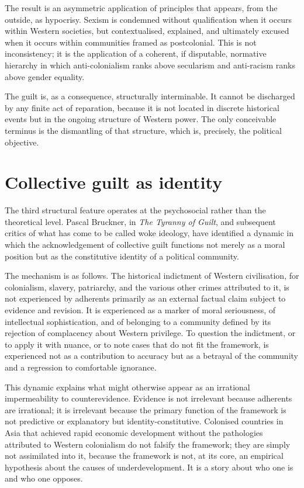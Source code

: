 	The result is an asymmetric application of principles that appears, from the outside,
	as hypocrisy. Sexism is condemned without qualification when it occurs within Western
	societies, but contextualised, explained, and ultimately excused when it occurs
	within communities framed as postcolonial. This is not inconsistency; it is the
	application of a coherent, if disputable, normative hierarchy in which
	anti-colonialism ranks above secularism and anti-racism ranks above gender equality.
	
	The guilt is, as a consequence, structurally interminable. It cannot be discharged
	by any finite act of reparation, because it is not located in discrete historical
	events but in the ongoing structure of Western power. The only conceivable terminus
	is the dismantling of that structure, which is, precisely, the political objective.
	
	\section{Collective guilt as identity}
	
	The third structural feature operates at the psychosocial rather than the
	theoretical level. Pascal Bruckner, in \emph{The Tyranny of Guilt}, and subsequent
	critics of what has come to be called woke ideology, have identified a dynamic in
	which the acknowledgement of collective guilt functions not merely as a moral
	position but as the constitutive identity of a political community.
	
	The mechanism is as follows. The historical indictment of Western civilisation, for
	colonialism, slavery, patriarchy, and the various other crimes attributed to it, is
	not experienced by adherents primarily as an external factual claim subject to
	evidence and revision. It is experienced as a marker of moral seriousness, of
	intellectual sophistication, and of belonging to a community defined by its
	rejection of complacency about Western privilege. To question the indictment, or to
	apply it with nuance, or to note cases that do not fit the framework, is experienced
	not as a contribution to accuracy but as a betrayal of the community and a
	regression to comfortable ignorance.
	
	This dynamic explains what might otherwise appear as an irrational impermeability
	to counterevidence. Evidence is not irrelevant because adherents are irrational; it
	is irrelevant because the primary function of the framework is not predictive or
	explanatory but identity-constitutive. Colonised countries in Asia that achieved
	rapid economic development without the pathologies attributed to Western colonialism
	do not falsify the framework; they are simply not assimilated into it, because the
	framework is not, at its core, an empirical hypothesis about the causes of
	underdevelopment. It is a story about who one is and who one opposes.
	
